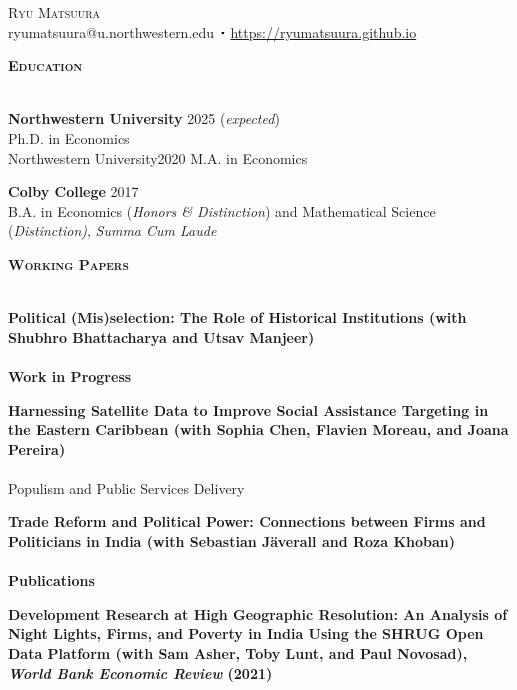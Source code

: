 \documentclass[11pt]{article}
\newcommand{\lineunder}{\vspace*{-8pt} \\ \hspace*{-18pt} \hrulefill \\}
\newcommand{\header}[1]{{\hspace*{-15pt}\vspace*{6pt} \textsc{#1}} \vspace*{-6pt} \lineunder}
\newcommand{\contact}[2]{
\begin{center}
{\LARGE \scshape {#1}}\\
#2
\end{center}
\vspace*{-8pt}
}
\newcommand{\sbt}{\,\begin{picture}(-1,1)(-1,-3)\circle*{2}\end{picture}\ }
\newcommand{\schoolwithcourses}[4]{
 \textbf{#1} \hfill{#2}\\
    #3\\
\vspace*{5pt}
}
\begin{document}

\small
\smallskip
\vspace*{-35pt}

\contact{Ryu Matsuura}
{ryumatsuura@u.northwestern.edu $\sbt$ \url{https://ryumatsuura.github.io}}


\header{\textbf{Education}}
\vspace{2mm}
\schoolwithcourses{Northwestern University}{2025 (\textit{expected})}{\hspace{2mm} Ph.D. in Economics}

\schoolwithcourses{Northwestern University}{2020}{\hspace{2mm} M.A. in Economics}

\schoolwithcourses{Colby College}{2017}{\hspace{2mm} B.A. in Economics (\textit{Honors \& Distinction}) and Mathematical Science (\textit{Distinction)}, \textit{Summa Cum Laude}}
\hfill{}
\vspace{3mm}


\header{\textbf{Working Papers}}
\vspace{2mm}

\schoolwithcourses{Political (Mis)selection: The Role of Historical Institutions \textnormal{(with Shubhro Bhattacharya and Utsav Manjeer)}}{}{~\vspace{0mm}}  

\header{\textbf{Work in Progress}}
\vspace{2mm}

\schoolwithcourses{Harnessing Satellite Data to Improve Social Assistance Targeting in the Eastern Caribbean \textnormal{(with Sophia Chen, Flavien Moreau, and Joana Pereira)}}{}{~\vspace{-3mm}}

\schoolwithcourses{Populism and Public Services Delivery}{}{~\vspace{-3mm}}  

\schoolwithcourses{Trade Reform and Political Power: Connections between Firms and Politicians in India \textnormal{(with Sebastian J\"{a}verall and Roza Khoban)}}{}{~\vspace{0mm}}


\header{\textbf{Publications}}
\vspace{2mm}
\schoolwithcourses{Development Research at High Geographic Resolution: An Analysis of Night Lights, Firms, and Poverty in India Using the SHRUG Open Data Platform \textnormal{(with Sam Asher, Toby Lunt, and Paul Novosad), \textit{World Bank Economic Review} (2021)}}{}{~\vspace{0mm}}  
\hfill{}
\end{document}
